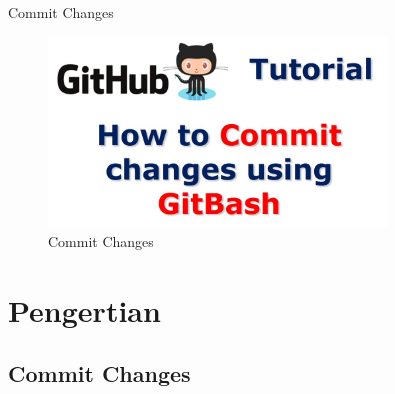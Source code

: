 
\sloppy
\begin{center}{\fontsize{18pt}{18pt}\selectfont Commit Changes \\}\end{center} \par



\begin{figure}[ht]
	\centerline{\includegraphics[width=0.80\textwidth]{Figures/dapgit1.jpg}}
	\caption{Commit Changes}
	\label{Commit Changes}
\end{figure}





\section {Pengertian }
\subsection {Commit Changes}


